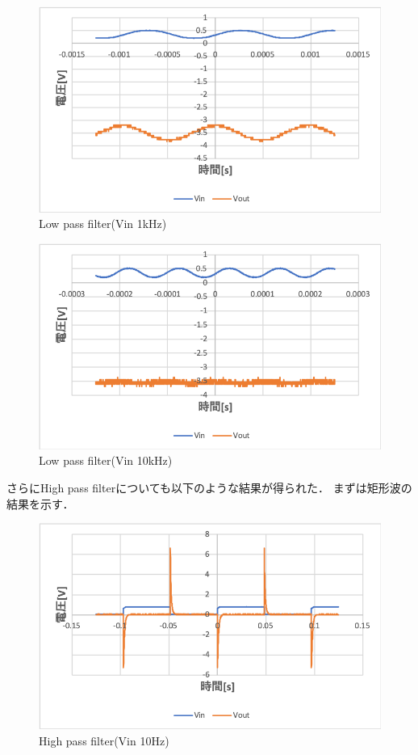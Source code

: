 \documentclass[11pt, a4paper,twocolumn]{jarticle}
\begin{document}
\begin{figure}[htbp]
 \begin{center}
  \includegraphics[width=0.8\linewidth]{fig37.png}
 \end{center}
 \caption{Low pass filter(Vin 1kHz)}
 \label{fig:37}
\end{figure}

\begin{figure}[htbp]
 \begin{center}
  \includegraphics[width=0.8\linewidth]{fig38.png}
 \end{center}
 \caption{Low pass filter(Vin 10kHz)}
 \label{fig:38}
\end{figure}

\newpage

さらにHigh pass filterについても以下のような結果が得られた．
まずは矩形波の結果を示す．

\begin{figure}[htbp]
 \begin{center}
  \includegraphics[width=0.8\linewidth]{fig39.png}
 \end{center}
 \caption{High pass filter(Vin 10Hz)}
 \label{fig:39}
\end{figure}
\end{document}
